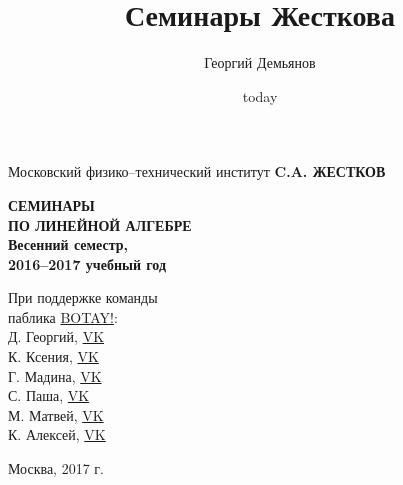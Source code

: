 \documentclass[a4paper, 12pt, openany]{book}
\title{Семинары Жесткова}
\author{Георгий Демьянов}
\date{today}
\begin{document}
\def\chaptername{Семинар} %
\setcounter{tocdepth}{1} %


\begin{titlepage}
	\begin{center}
		{\large Московский физико--технический институт}
		\vfill
		\vfill
		{\Large \textbf{C.A. ЖЕСТКОВ}}
		\vspace{1.5cm}
		
		
		{\textbf{{\Huge СЕМИНАРЫ\\\smallskip ПО ЛИНЕЙНОЙ АЛГЕБРЕ}\\ \Large Весенний семестр,\\ 2016--2017 учебный год}}
		\bigskip
	\end{center}
	\vfill
	
	\hfill\begin{minipage}{0.4\textwidth}
		{\centering
				При поддержке команды\\ паблика \href{https://vk.com/botay_fizteh}{BOTAY!}:\\
				Д. Георгий, \href{https://vk.com/id37346992}{VK}\\
				К. Ксения, \href{https://vk.com/id143862366}{VK}\\
				Г. Мадина, \href{https://vk.com/id226312463}{VK}\\
				С. Паша, \href{https://vk.com/id181006282}{VK}\\
				М. Матвей, \href{https://vk.com/id62009425}{VK}\\
				К. Алексей, \href{https://vk.com/id92540660}{VK}\\	
			}
	\end{minipage}%

	\vfill
	\begin{center}
		Москва, 2017 г.
	\end{center}
\end{titlepage}

\pagestyle{plain1}
{
\tableofcontents
}


\newpage
{}
\pagestyle{plain}
\end{document}
